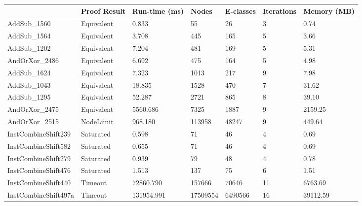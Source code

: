 \begin{tabular}{lllllll}
\toprule
 & Proof Result & Run-time (ms) & Nodes & E-classes & Iterations & Memory (MB) \\
\midrule
AddSub\_1560 & Equivalent & 0.833 & 55 & 26 & 3 & 0.74 \\
AddSub\_1564 & Equivalent & 3.708 & 445 & 165 & 5 & 3.66 \\
AddSub\_1202 & Equivalent & 7.204 & 481 & 169 & 5 & 5.31 \\
AndOrXor\_2486 & Equivalent & 6.692 & 475 & 164 & 5 & 4.98 \\
AddSub\_1624 & Equivalent & 7.323 & 1013 & 217 & 9 & 7.98 \\
AddSub\_1043 & Equivalent & 18.835 & 1528 & 470 & 7 & 31.62 \\
AddSub\_1295 & Equivalent & 52.287 & 2721 & 865 & 8 & 39.10 \\
AndOrXor\_2475 & Equivalent & 5560.686 & 7325 & 1887 & 9 & 2159.25 \\
AndOrXor\_2515 & NodeLimit & 968.180 & 113958 & 48247 & 9 & 449.64 \\
InstCombineShift239 & Saturated & 0.598 & 71 & 46 & 4 & 0.69 \\
InstCombineShift582 & Saturated & 0.655 & 71 & 46 & 4 & 0.69 \\
InstCombineShift279 & Saturated & 0.939 & 79 & 48 & 4 & 0.78 \\
InstCombineShift476 & Saturated & 1.513 & 137 & 75 & 6 & 1.51 \\
InstCombineShift440 & Timeout & 72860.790 & 157666 & 70646 & 11 & 6763.69 \\
InstCombineShift497a & Timeout & 131954.991 & 17509554 & 6490566 & 16 & 39112.59 \\
\bottomrule
\end{tabular}
